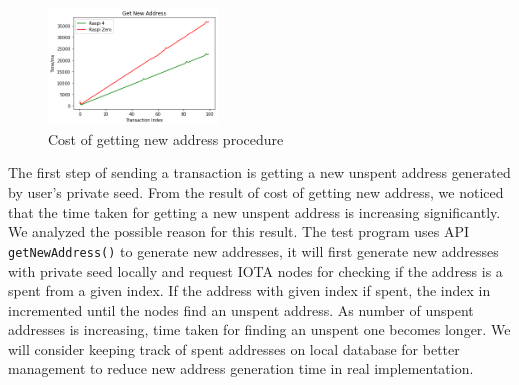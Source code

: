 \begin{figure}[h]
    \centering
    \includegraphics[width=0.4\textwidth,trim={0 0 0 0},clip]{figs/get_new_address.png}
    \caption{Cost of getting new address procedure}
    \label{fig:cost_getting_new_address}
\end{figure}

The first step of sending a transaction is getting a new unspent address generated by user's private seed.
From the result of cost of getting new address, we noticed that the time taken for getting a new unspent address is increasing significantly. 
We analyzed the possible reason for this result. The test program uses API \texttt{getNewAddress()} to generate new addresses, it will first generate new addresses with private seed locally and request IOTA nodes for checking if the address is a spent from a given index.
If the address with given index if spent, the index in incremented until the nodes find an unspent address. As number of unspent addresses is increasing, time taken for finding an unspent one becomes longer. 
We will consider keeping track of spent addresses on local database for better management to reduce new address generation time in real implementation.




